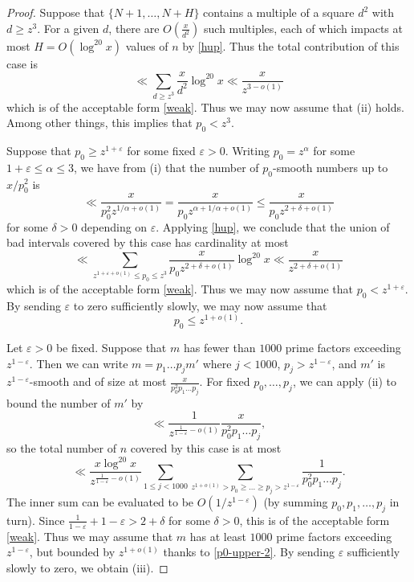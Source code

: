 \documentclass[12pt]{amsart}
\newcommand{\eps}{\varepsilon}
\begin{document}
\begin{proof}
Suppose that $\{N+1,\dots,N+H\}$ contains a multiple of a square $d^2$ with $d \geq z^3$.  For a given $d$, there are $O(\frac{x}{d^2})$ such multiples, each of which impacts at most $H = O(\log^{20} x)$ values of $n$ by \eqref{hup}.  Thus the total contribution of this case is
$$ \ll \sum_{d \geq z^3} \frac{x}{d^2} \log^{20} x \ll \frac{x}{z^{3-o(1)}}$$
which is of the acceptable form \eqref{weak}. Thus we may now assume that (ii) holds. Among other things, this implies that $p_0 < z^3$.

Suppose that $p_0 \geq z^{1+\eps}$ for some fixed $\eps>0$.  Writing $p_0 = z^{\alpha}$ for some $1+\eps \leq \alpha \leq 3$, we have from (i) that the number of $p_0$-smooth numbers up to $x/p_0^2$ is
$$ \ll \frac{x}{p_0^2 z^{1/\alpha+o(1)}} = \frac{x}{p_0 z^{\alpha+1/\alpha+o(1)}} \leq \frac{x}{p_0 z^{2+\delta+o(1)}}$$
for some $\delta>0$ depending on $\eps$.  Applying \eqref{hup}, we conclude that the union of bad intervals covered by this case has cardinality at most
$$ \ll \sum_{z^{1+\eps+o(1)} \leq p_0 \leq z^3} \frac{x}{p_0 z^{2+\delta+o(1)}} \log^{20} x \ll \frac{x}{z^{2+\delta+o(1)}}$$
which is of the acceptable form \eqref{weak}.  Thus we may now assume that $p_0 < z^{1+\eps}$.  By sending $\eps$ to zero sufficiently slowly, we may now assume that
\begin{equation}\label{p0-upper-2}
    p_0 \leq z^{1+o(1)}.
\end{equation}


Let $\eps>0$ be fixed.  Suppose that $m$ has fewer than $1000$ prime factors exceeding $z^{1-\eps}$.
Then we can write $m = p_1 \dots p_j m'$ where $j < 1000$, $p_j > z^{1-\eps}$, and $m'$ is $z^{1-\eps}$-smooth and of size at most $\frac{x}{p_0^2 p_1 \dots p_j}$.  For fixed $p_0,\dots,p_j$, we can apply (ii) to bound the number of $m'$ by
$$ \ll \frac{1}{z^{\frac{1}{1-\eps}-o(1)}} \frac{x}{p_0^2 p_1 \dots p_j},$$
so the total number of $n$ covered by this case is at most
$$ \ll \frac{x \log^{20} x}{z^{\frac{1}{1-\eps}-o(1)}}
\sum_{1 \leq j < 1000} \sum_{z^{1+o(1)} > p_0 \geq \dots \geq p_j > z^{1-\eps}} \frac{1}{p_0^2 p_1 \dots p_j}.$$
The inner sum can be evaluated to be $O( 1 / z^{1-\eps})$ (by summing $p_0, p_1, \dots, p_j$ in turn).  Since $\frac{1}{1-\eps} + 1-\eps > 2+\delta$ for some $\delta>0$, this is of the acceptable form \eqref{weak}.  Thus we may assume that $m$ has at least $1000$ prime factors exceeding $z^{1-\eps}$, but bounded by $z^{1+o(1)}$ thanks to \eqref{p0-upper-2}.  By sending $\eps$ sufficiently slowly to zero, we obtain (iii).
\end{proof}
\end{document}
